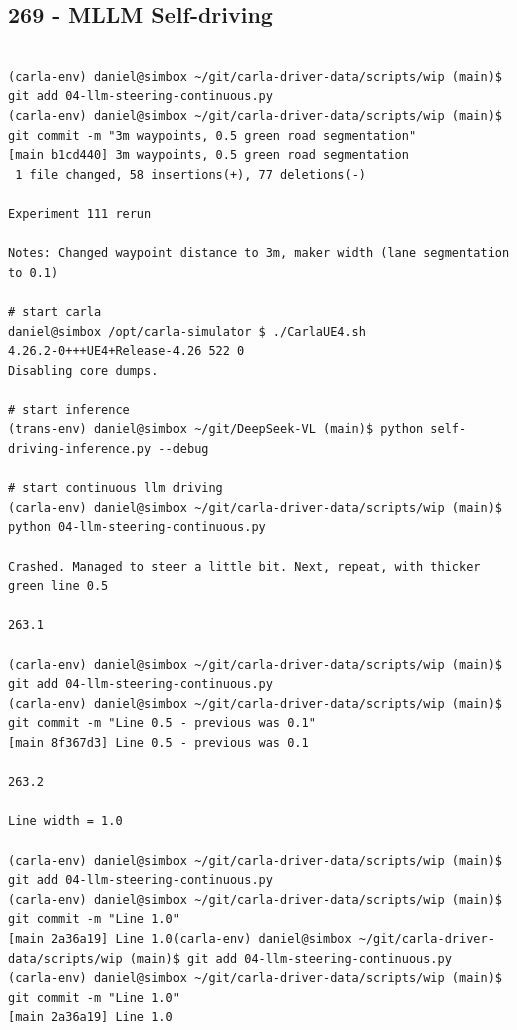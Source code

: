 \begin{verbatim}
\end{verbatim}

\subsection{269 - MLLM Self-driving}
\label{app_res:269}

\begin{verbatim}

(carla-env) daniel@simbox ~/git/carla-driver-data/scripts/wip (main)$ git add 04-llm-steering-continuous.py 
(carla-env) daniel@simbox ~/git/carla-driver-data/scripts/wip (main)$ git commit -m "3m waypoints, 0.5 green road segmentation"
[main b1cd440] 3m waypoints, 0.5 green road segmentation
 1 file changed, 58 insertions(+), 77 deletions(-)
 
Experiment 111 rerun

Notes: Changed waypoint distance to 3m, maker width (lane segmentation
to 0.1)

# start carla
daniel@simbox /opt/carla-simulator $ ./CarlaUE4.sh 
4.26.2-0+++UE4+Release-4.26 522 0
Disabling core dumps.

# start inference
(trans-env) daniel@simbox ~/git/DeepSeek-VL (main)$ python self-driving-inference.py --debug

# start continuous llm driving
(carla-env) daniel@simbox ~/git/carla-driver-data/scripts/wip (main)$ python 04-llm-steering-continuous.py

Crashed. Managed to steer a little bit. Next, repeat, with thicker green line 0.5

263.1

(carla-env) daniel@simbox ~/git/carla-driver-data/scripts/wip (main)$ git add 04-llm-steering-continuous.py 
(carla-env) daniel@simbox ~/git/carla-driver-data/scripts/wip (main)$ git commit -m "Line 0.5 - previous was 0.1"
[main 8f367d3] Line 0.5 - previous was 0.1

263.2

Line width = 1.0

(carla-env) daniel@simbox ~/git/carla-driver-data/scripts/wip (main)$ git add 04-llm-steering-continuous.py 
(carla-env) daniel@simbox ~/git/carla-driver-data/scripts/wip (main)$ git commit -m "Line 1.0"
[main 2a36a19] Line 1.0(carla-env) daniel@simbox ~/git/carla-driver-data/scripts/wip (main)$ git add 04-llm-steering-continuous.py 
(carla-env) daniel@simbox ~/git/carla-driver-data/scripts/wip (main)$ git commit -m "Line 1.0"
[main 2a36a19] Line 1.0


\end{verbatim}
